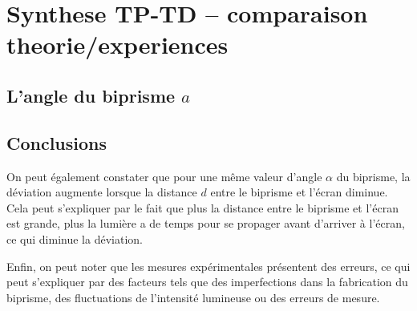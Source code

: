 \documentclass[11pt, a4paper]{article}
\begin{document}
\section{Synthese TP-TD – comparaison theorie/experiences }
    \subsection{L’angle du biprisme $a$}
    \subsection{Conclusions}
    On peut également constater que pour une même valeur d'angle $\alpha$ du biprisme, la déviation augmente lorsque la distance $d$ entre le biprisme et l'écran diminue. Cela peut s'expliquer par le fait que plus la distance entre le biprisme et l'écran est grande, plus la lumière a de temps pour se propager avant d'arriver à l'écran, ce qui diminue la déviation.

    Enfin, on peut noter que les mesures expérimentales présentent des erreurs, ce qui peut s'expliquer par des facteurs tels que des imperfections dans la fabrication du biprisme, des fluctuations de l'intensité lumineuse ou des erreurs de mesure.
\end{document}
